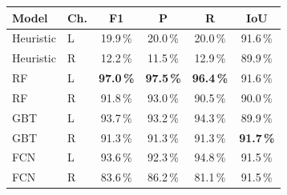 \begin{table}[t]
\centering
\begin{minipage}[t]{0.50\linewidth}
\centering
\small
\setlength{\tabcolsep}{5pt}
\begin{tabular}{llcccc}
\toprule
\textbf{Model} & \textbf{Ch.} & \textbf{F1} & \textbf{P} & \textbf{R} & \textbf{IoU} \\
\midrule
Heuristic      & L & 19.9\,\% & 20.0\,\% & 20.0\,\% & 91.6\,\% \\
Heuristic      & R & 12.2\,\% & 11.5\,\% & 12.9\,\% & 89.9\,\% \\
\midrule
RF             & L & \textbf{97.0\,\%} & \textbf{97.5\,\%} & \textbf{96.4\,\%} & 91.6\,\% \\
RF             & R & 91.8\,\% & 93.0\,\% & 90.5\,\% & 90.0\,\% \\
GBT            & L & 93.7\,\% & 93.2\,\% & 94.3\,\% & 89.9\,\% \\
GBT            & R & 91.3\,\% & 91.3\,\% & 91.3\,\% & \textbf{91.7\,\%} \\
FCN            & L & 93.6\,\% & 92.3\,\% & 94.8\,\% & 91.5\,\% \\
FCN            & R & 83.6\,\% & 86.2\,\% & 81.1\,\% & 91.5\,\% \\
\bottomrule
\end{tabular}
\par\vspace{4pt}
\label{tab:deployment}
\end{minipage}\hspace{0.02\linewidth}
\begin{minipage}[t]{0.44\linewidth}
\vspace{-3.7\baselineskip}
\centering

\end{minipage}
\end{table}


